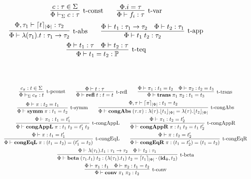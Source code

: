 \documentclass[10pt]{article}
\begin{document}
\begin{figure}[ht!]
\begin{gather*}  
\infer[\mbox{\typconst}]{
  \typeof{\Si}{\Phi}{c}{\tau}
}{
  c:\tau \in \Si
}
\qquad
\infer[\mbox{\typvar}]{
  \tyof{\Phi}{f_i}{\tau}
}{
  \Phi.i = \tau
}
\\
\infer[\mbox{\typabs}]{
  \tyof{\Phi}{\dtabs{\tau_1}{t}}{\tau_1 \to \tau_2}
}{
  \tyof{\Phi,\tau_1}{\fresheningz{t}{\len{\Phi}}}{\tau_2}
}
\qquad
\infer[\mbox{\typapp}]{
  \tyof{\Phi}{t_1\app t_2}{\tau_2}
}{
  \tyof{\Phi}{t_1}{\tau_1 \to \tau_2}
  &
  \tyof{\Phi}{t_2}{\tau_1}
}
\\
\infer[\mbox{\typteq}]{
  \tyof{\Phi}{t_1 = t_2}{\prop}
}{
  \tyof{\Phi}{t_1}{\tau}
  &
  \tyof{\Phi}{t_2}{\tau}
}
\end{gather*}
\\
\\
\begin{gather*}
\infer[\mbox{\typpconst}]{
  \typeof{\Si}{\Phi}{c_\pi}{t}
}{
  c_\pi:t \in \Sigma
}
\qquad
\infer[\mbox{\typrefl}]{
  \tyof{\Phi}{\refl t}{t = t}
}{
  \tyof{\Phi}{t}{\tau}
}
\qquad
\infer[\mbox{\typtrans}]{
  \tyof{\Phi}{\trans{\pi_1}{\pi_2}}{t_1 = t_3}
}{
  \tyof{\Phi}{\pi_1}{t_1 = t_2}
  &
  \tyof{\Phi}{\pi_2}{t_2 = t_3}
}
\\
\infer[\mbox{\typsymm}]{
  \tyof{\Phi}{\symm{\pi}}{t_1 = t_2}
}{
  \tyof{\Phi}{\pi}{t_2 = t_1}
}
\qquad
\infer[\mbox{\typcongabs}]{
  \tyof{\Phi}{\dcongtabs{\tau}{\pi}}{\dtabs{\tau}
    {\bindingz{t_1}{\len{\Phi}}} = \dtabs{\tau}{\bindingz{t_2}{\len{\Phi}}}}
}{
  \tyof{\Phi,\tau}{\fresheningz{\pi}{\len{\Phi}}}{t_1 = t_2}
}
\\
\infer[\mbox{\typcongappl}]{
  \tyof{\Phi}{\congappl{\pi}}{t_1\app t_2 = t_1'\app t_2}
}{
  \tyof{\Phi}{\pi_1}{t_1 = t_1'}
}
\qquad
\infer[\mbox{\typcongappr}]{
  \tyof{\Phi}{\congappr{\pi}}{t_1\app t_2 = t_1\app t_2'}
}{
  \tyof{\Phi}{\pi_1}{t_2 = t_2'}
}
\\
\infer[\mbox{\typcongeql}]{
  \tyof{\Phi}{\congeql{\pi}}{(t_1 = t_2) = (t_1' = t_2)}
}{
  \tyof{\Phi}{\pi}{t_1 = t_1'}
}
\qquad
\infer[\mbox{\typcongeqr}]{
  \tyof{\Phi}{\congeqr{\pi}}{(t_1 = t_2') = (t_1 = t_2)}
}{
  \tyof{\Phi}{\pi}{t_2 = t_2'}
}
\\
\infer[\mbox{\typbeta}]{
  \tyof{\Phi}{\dtbetaconv{\tau_1}{t_1}{t_2}}
       {(\dtabs{\tau_1}{t_1})\app t_2 = \subst{\fresheningz{t_1}{\len{\Phi}}}{(\idsubst{\Phi},t_2)}}
}{
  \tyof{\Phi}{\dtabs{\tau_1}{t_1}}{\tau_1 \to \tau_2}
  &
  \tyof{\Phi}{t_2}{\tau_1}
}
\\
\infer[\mbox{\typconv}]{
  \tyof{\Phi}{\conv{\pi_1}{\pi_2}}{t_2}
}{
  \tyof{\Phi}{\pi_1}{t_1}
  &
  \tyof{\Phi}{\pi_2}{t_1 = t_2}
}
\end{gather*}  


\end{figure}
\end{document}
